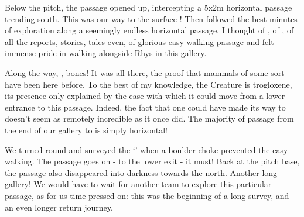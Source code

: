 Below the pitch, the passage opened up, intercepting a 5x2m horizontal passage trending south. This was our way to the surface ! Then followed the best minutes of exploration along a seemingly endless horizontal passage. I thought of , of , of all the reports, stories, tales even, of glorious easy walking passage and felt immense pride in walking alongside Rhys in this gallery.

Along the way, , bones! It was all there, the proof that mammals of some sort have been here before. To the best of my knowledge, the Creature is trogloxene, its presence only explained by the ease with which it could move from a lower entrance to this passage. Indeed, the fact that one could have made its way to  doesn't seem as remotely incredible as it once did. The majority of passage from the end of our gallery to  is simply horizontal!

We turned round and surveyed the `' when a boulder choke prevented the easy walking. The passage goes on - to the lower exit - it must! Back at the pitch base, the passage also disappeared into darkness towards the north. Another long gallery! We would have to wait for another team to explore this particular passage, as for us time pressed on: this was the beginning of a long survey, and an even longer return journey.

